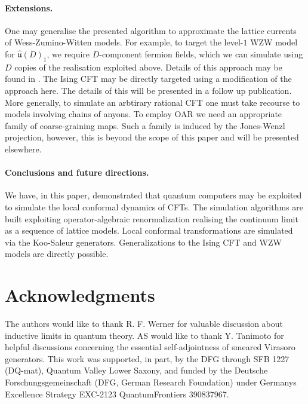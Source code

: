 \documentclass[12pt]{article}
\newcommand{\1}{\mathds{1}}
\begin{document}
\paragraph*{Extensions.} One may generalise the presented algorithm to approximate the lattice currents of Wess-Zumino-Witten models. For example, to target the level-$1$ WZW model for $\widehat{\mathfrak{u}}(D)_{1}$, we require $D$-component fermion fields, which we can simulate using $D$ copies of the realisation exploited above. Details of this approach may be found in \cite{osborneConformal2021}. The Ising CFT may be directly targeted using a modification of the approach here. The details of this will be presented in a follow up publication. More generally, to simulate an arbtirary rational CFT one must take recourse to models involving chains of anyons. To employ OAR we need an appropriate family of coarse-graining maps. Such a family is induced by the Jones-Wenzl projection, however, this is beyond the scope of this paper and will be presented elsewhere.

\paragraph*{Conclusions and future directions.} We have, in this paper, demonstrated that quantum computers may be exploited to simulate the local conformal dynamics of CFTs. The simulation algorithms are built exploiting operator-algebraic renormalization realising the continuum limit as a sequence of lattice models. Local conformal transformations are simulated via the Koo-Saleur generators. Generalizations to the Ising CFT and WZW models are directly possible.






\section*{Acknowledgments}
The authors would like to thank R. F. Werner for valuable discussion about inductive limits
in quantum theory. AS would like to thank Y. Tanimoto for helpful discussions concerning
the essential self-adjointness of smeared Virasoro generators. This work was supported, in part, by the DFG through SFB 1227 (DQ-mat), Quantum Valley Lower Saxony, and funded by the Deutsche Forschungsgemeinschaft (DFG, German Research Foundation) under Germanys Excellence Strategy EXC-2123 QuantumFrontiers 390837967.  
\end{document}
